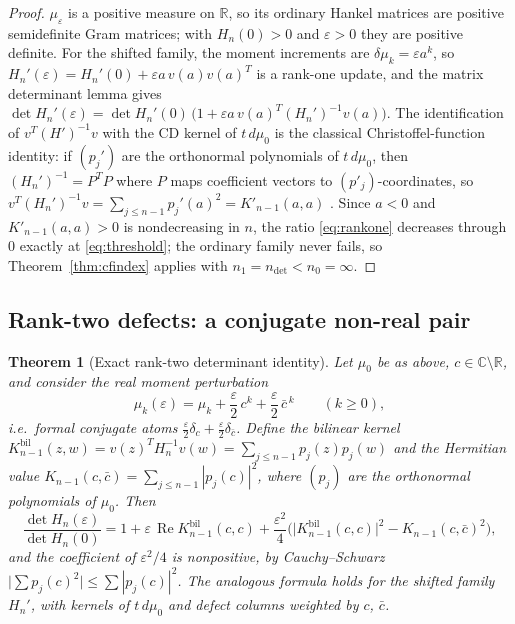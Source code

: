 \documentclass[11pt]{amsart}
\newtheorem{theorem}{Theorem}[section]
\theoremstyle{definition}
\theoremstyle{remark}
\newcommand{\R}{\mathbb{R}}
\newcommand{\C}{\mathbb{C}}
\newcommand{\dd}{\,d}
\newcommand{\eps}{\varepsilon}
\DeclareMathOperator{\Rea}{Re}
\begin{document}
\begin{proof}
$\mu_\eps$ is a positive measure on $\R$, so its ordinary Hankel matrices are
positive semidefinite Gram matrices; with $H_n(0)>0$ and $\eps>0$ they are
positive definite. For the shifted family, the moment increments are
$\delta\mu_{k}=\eps a^{k}$, so
$H_n'(\eps)=H_n'(0)+\eps a\,v(a)v(a)^{T}$ is a rank-one update, and the
matrix determinant lemma gives
$\det H_n'(\eps)=\det H_n'(0)\,\big(1+\eps a\,v(a)^{T}(H_n')^{-1}v(a)\big)$.
The identification of $v^{T}(H')^{-1}v$ with the CD kernel of $t\dd\mu_0$ is
the classical Christoffel-function identity: if $(p_j')$ are the orthonormal
polynomials of $t\dd\mu_0$, then $(H_n')^{-1}=P^{T}P$ where $P$ maps
coefficient vectors to $(p'_j)$-coordinates, so
$v^{T}(H_n')^{-1}v=\sum_{j\le n-1}p_j'(a)^2=K'_{n-1}(a,a)$
\cite{Nevai,Totik}. Since $a<0$ and $K'_{n-1}(a,a)>0$ is nondecreasing in
$n$, the ratio \eqref{eq:rankone} decreases through $0$ exactly at
\eqref{eq:threshold}; the ordinary family never fails, so
Theorem~\ref{thm:cfindex} applies with $n_1=n_{\det}<n_0=\infty$.
\end{proof}

\subsection{Rank-two defects: a conjugate non-real pair}

\begin{theorem}[Exact rank-two determinant identity]\label{thm:ranktwo}
Let $\mu_0$ be as above, $c\in\C\setminus\R$, and consider the real moment
perturbation
\[
\mu_k(\eps)=\mu_k+\frac\eps2\,c^k+\frac\eps2\,\bar c^{\,k}\qquad(k\ge0),
\]
i.e.\ formal conjugate atoms $\tfrac\eps2\delta_c+\tfrac\eps2\delta_{\bar c}$.
Define the bilinear kernel $K^{\mathrm{bil}}_{n-1}(z,w)=v(z)^{T}H_n^{-1}v(w)
=\sum_{j\le n-1}p_j(z)p_j(w)$ and the Hermitian value
$K_{n-1}(c,\bar c)=\sum_{j\le n-1}|p_j(c)|^2$, where $(p_j)$ are the
orthonormal polynomials of $\mu_0$. Then
\begin{equation}\label{eq:ranktwo}
\frac{\det H_n(\eps)}{\det H_n(0)}
=1+\eps\,\Rea K^{\mathrm{bil}}_{n-1}(c,c)
+\frac{\eps^2}4\Big(\big|K^{\mathrm{bil}}_{n-1}(c,c)\big|^2
-K_{n-1}(c,\bar c)^2\Big),
\end{equation}
and the coefficient of $\eps^2/4$ is nonpositive, by Cauchy--Schwarz
$\big|\sum p_j(c)^2\big|\le\sum|p_j(c)|^2$. The analogous formula holds for
the shifted family $H_n'$, with kernels of $t\dd\mu_0$ and defect columns
weighted by $c$, $\bar c$.
\end{theorem}
\end{document}
